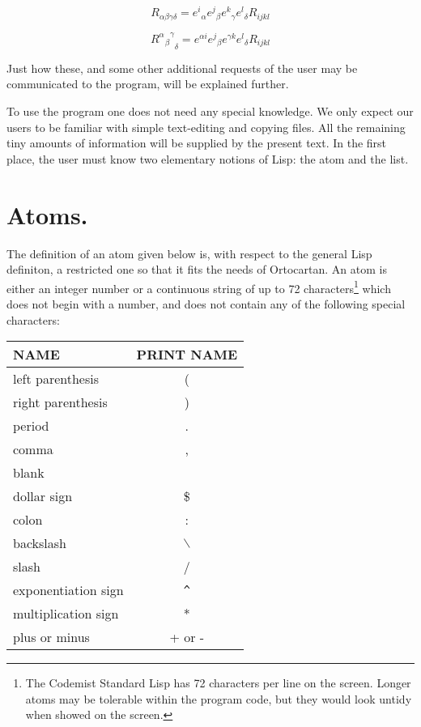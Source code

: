 \begin{equation}
R_{\alpha \beta \gamma \delta} = {e^i}_{\alpha} {e^j}_{\beta} {e^k}_{\gamma}
{e^l}_{\delta} R_{ijkl}
\end{equation}

\begin{equation}
{{{R^{\alpha}}_{\beta}}^{\gamma}}_{\delta} = e^{\alpha i} {e^j}_{\beta}
e^{\gamma k} {e^l}_{\delta} R_{ijkl}
\end{equation}

\noindent Just how these, and some other additional  requests  of
     the  user may be communicated to the program, will be explained further.

To use the program one does not need any special knowledge. We  only  expect
our  users  to  be familiar with simple text-editing and copying files. All the
remaining tiny amounts of information  will  be  supplied by the present text.
In the first
     place, the user must know two elementary  notions  of  Lisp:
     the atom and the list.

\section {Atoms.}


The definition of an atom given below is, with  respect to  the  general Lisp
definiton, a restricted one so that it fits the needs of Ortocartan. An atom is
either  an  integer number  or  a continuous string of up to 72
characters\footnote{The Codemist Standard Lisp has 72 characters per line on
the screen. Longer atoms may be tolerable within the program code, but they
would look untidy when showed on the screen.} which does not begin with a
number, and does not contain any of the following special characters:

\bigskip

\begin{tabular}{|l|c|}
\hline
 NAME    &  PRINT NAME \\ \hline
 left parenthesis    & ( \\ \hline
 right parenthesis   & ) \\ \hline
 period & . \\ \hline
 comma & , \\ \hline
 blank & \  \\ \hline
 dollar sign & \$ \\ \hline
 colon & : \\ \hline
 backslash & $\backslash$ \\ \hline
 slash & / \\ \hline
 exponentiation sign & \verb+^+ \\ \hline
 multiplication sign & * \\ \hline
 plus or minus & + or - \\ \hline
\end{tabular}

